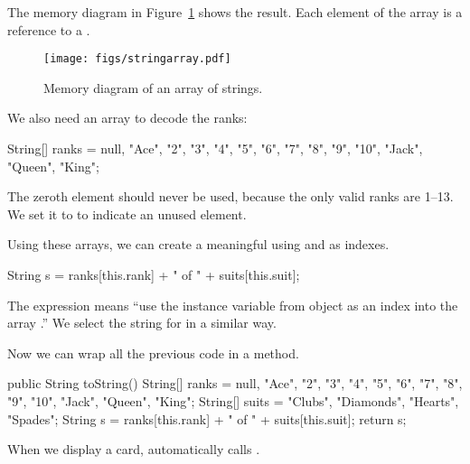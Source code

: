 The memory diagram in Figure~\ref{fig.stringarray} shows the result.
Each element of the array is a reference to a .

\begin{figure}[!ht]
\begin{center}
\texttt{[image: figs/stringarray.pdf]}
\caption{Memory diagram of an array of strings.}
\label{fig.stringarray}
\end{center}
\end{figure}

We also need an array to decode the ranks:

\begin{code}
String[] ranks = {null, "Ace", "2", "3", "4", "5", "6",
           "7", "8", "9", "10", "Jack", "Queen", "King"};
\end{code}

The zeroth element should never be used, because the only valid ranks are 1--13.
We set it to  to indicate an unused element.

Using these arrays, we can create a meaningful  using  and  as indexes.

\begin{code}
String s = ranks[this.rank] + " of " + suits[this.suit];
\end{code}

The expression  means ``use the instance variable  from  object as an index into the array .''
We select the string for  in a similar way.

Now we can wrap all the previous code in a  method.

\begin{code}
public String toString() {
    String[] ranks = {null, "Ace", "2", "3", "4", "5", "6",
               "7", "8", "9", "10", "Jack", "Queen", "King"};
    String[] suits = {"Clubs", "Diamonds", "Hearts", "Spades"};
    String s = ranks[this.rank] + " of " + suits[this.suit];
    return s;
}
\end{code}

When we display a card,  automatically calls .

